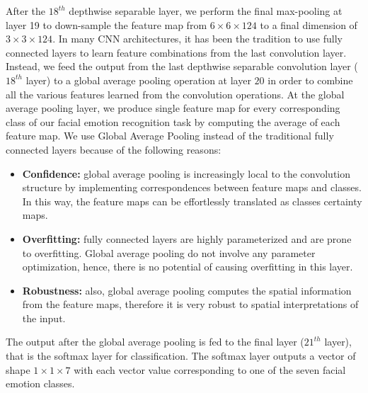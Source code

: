 \documentclass[master]{thesis-uestc}
\begin{document}
After the $18^{th}$ depthwise separable layer, we perform the final max-pooling at layer 19 to down-sample the feature map from $6 \times 6 \times 124$ to a final dimension of $3 \times 3 \times 124$. In many CNN architectures, it has been the tradition to use fully connected layers to learn feature combinations from the last convolution layer. Instead, we feed the output from the last depthwise separable convolution layer ($18^{th}$ layer) to a global average pooling operation at layer $20$ in order to combine all the various features learned from the convolution operations. At the global average pooling layer, we produce single feature map for every corresponding class of our facial emotion recognition task by computing the average of each feature map. We use Global Average Pooling instead of the traditional fully connected layers because of the following reasons:
\begin{itemize}
    \item \textbf{Confidence:} global average pooling is increasingly local to the convolution structure by implementing correspondences between feature maps and classes. In this way, the feature maps can be effortlessly translated as classes certainty maps.
    \item \textbf{Overfitting:} fully connected layers are highly parameterized and are prone to overfitting. Global average pooling do not involve any parameter optimization, hence, there is no potential of causing overfitting in this layer.
    \item \textbf{Robustness: } also, global average pooling computes the spatial information from the feature maps, therefore it is very robust to spatial interpretations of the input.
\end{itemize}
The output after the global average pooling is fed to the final layer ($21^{th}$ layer), that is the softmax layer for classification. The softmax layer outputs a vector of shape $1 \times 1 \times 7$ with each vector value corresponding to one of the seven facial emotion classes.
\end{document}
